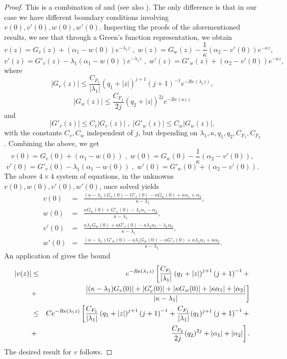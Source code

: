 \documentclass[12pt]{article}
\begin{document}
\begin{proof}
This is a combination of \cite[Lemma 7.3.6]{melenk} and \cite[Proposition 2.4.10]{PC} (see also \cite[Proposition 3]{PCarXiv}). The only difference is that in our case we have different boundary conditions involving $v(0),v'(0),w(0),w'(0)$. Inspecting the proofs of the aforementioned results, we see that through a Green's function representation, we obtain 
%
\[
v(z) = G_v(z) + (\alpha_1 - w(0)) e^{-\lambda_1 z} \; , \; w(z) = G_w(z) - \frac{1}{\kappa} (\alpha_2 - v'(0)) e^{-\kappa z},
\]
%
\[
v'(z) = G'_v(z) -\lambda_1 (\alpha_1 - w(0)) e^{-\lambda_1 z} \; , \; w'(z) = G'_w(z) + (\alpha_2 - v'(0)) e^{-\kappa z},
\]
where
\[
|G_v(z)| \leq \frac{C_{F_1}}{|\lambda_1 |}\left(
q_1+\left\vert z\right\vert \right) ^{j+1}\left( j+1\right) ^{-1} e^{-Re(\lambda_1 z)},
\]
\[
|G_w(z)| \leq \frac{C_{F_2}}{2j}\left( q_2+\left\vert z\right\vert \right) ^{2j} e^{-Re(\kappa z)}
\]
%
and
\[
|G'_v(z)| \leq C_v |G_v(z)| \; , \; |G'_w(z)| \leq C_w |G_w(z)|, 
\]
with the constants $C_v,C_w$ independent of $j$, but depending on $\lambda_1, \kappa, q_1, q_2, C_{F_1}, C_{F_2}$.
Combining the above, we get
%
\[
v(0) = G_v(0) + (\alpha_1-w(0)) \; , \; w(0) = G_w(0) - \frac{1}{\kappa} (\alpha_2-v'(0)),
\]
\[
v'(0) = G'_v(0) -\lambda_1 (\alpha_1-w(0)) \; , \; w'(0) = G'_w(0) + (\alpha_2-v'(0)).
\]
The above $4 \times 4$ system of equations, in the unknowns $v(0), w(0), v'(0), w'(0)$, once solved yields
\begin{eqnarray*}
v(0) &=& \frac{(\kappa - \lambda_1)G_v(0) - G'_v(0) - \kappa G_w(0) + \kappa \alpha_1 + \alpha_2}{\kappa - \lambda_1},\\
w(0) &=& \frac{\kappa G_w(0) + G'_v(0) - \lambda_1 \alpha_1 - \alpha_2}{\kappa - \lambda_1},\\
v'(0) &=& \frac{\kappa \lambda_1 G_w(0) + \kappa G'_v(0) - \kappa \lambda_1 \alpha_1 - \lambda_1 \alpha_2}{\kappa - \lambda_1},\\
w'(0) &=& \frac{(\kappa - \lambda_1)G'_w(0) - \kappa \lambda_1 G_w(0) - \kappa G'_v(0) + \kappa \lambda_1 \alpha_1 + \kappa \alpha_2}{\kappa - \lambda_1}.
\end{eqnarray*}
%
An application of \cite[Lemma 7.3.6]{melenk} gives the bound
\begin{eqnarray*}
|v(z)| &\leq& e^{-Re(\lambda_1 z)} \left[ \frac{C_{F_1}}{|\lambda_1|} \left(
q_1 + \left\vert z\right\vert \right) ^{j+1} \left( j+1\right) ^{-1} + \right. \\
&+& \left. \frac{\left\vert (\kappa - \lambda_1) G_v(0) \right\vert + \left\vert G'_v(0) \right\vert + \left\vert \kappa G_w(0) \right\vert + |\kappa \alpha_1| + |\alpha_2|}{|\kappa - \lambda_1|} \large\right] \\
&\leq& C e^{-Re(\lambda_1 z)} \left[ \frac{C_{F_1}}{|\lambda_1|} \left(
q_1 + \left\vert z\right\vert \right) ^{j+1} \left( j+1\right) ^{-1} + \frac{C_{F_1}}{|\lambda_1|} (q_1)^{j+1} \left( j+1\right) ^{-1} + \right. \\
&+& \left. \frac{C_{F_2}}{2j} (q_2)^{2j} + |\alpha_1| + |\alpha_2| \right].
\end{eqnarray*}
%
The desired result for $v$ follows. 


\end{proof}
\end{document}
